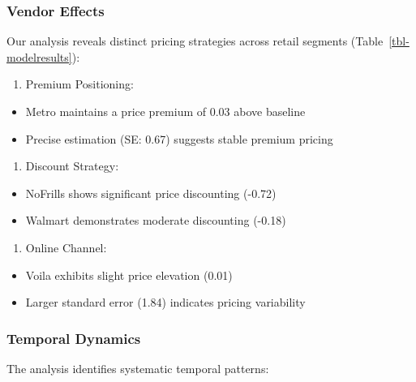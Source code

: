 \documentclass[
  letterpaper,
  DIV=11,
  numbers=noendperiod]{scrartcl}
\providecommand{\tightlist}{%
  \setlength{\itemsep}{0pt}\setlength{\parskip}{0pt}}\usepackage{longtable,booktabs,array}
\begin{document}
\subsubsection{Vendor Effects}\label{vendor-effects}

Our analysis reveals distinct pricing strategies across retail segments
(Table~\ref{tbl-modelresults}):

\begin{enumerate}
\def\labelenumi{\arabic{enumi}.}
\tightlist
\item
  Premium Positioning:
\end{enumerate}

\begin{itemize}
\tightlist
\item
  Metro maintains a price premium of 0.03 above baseline
\item
  Precise estimation (SE: 0.67) suggests stable premium pricing
\end{itemize}

\begin{enumerate}
\def\labelenumi{\arabic{enumi}.}
\setcounter{enumi}{1}
\tightlist
\item
  Discount Strategy:
\end{enumerate}

\begin{itemize}
\tightlist
\item
  NoFrills shows significant price discounting (-0.72)
\item
  Walmart demonstrates moderate discounting (-0.18)
\end{itemize}

\begin{enumerate}
\def\labelenumi{\arabic{enumi}.}
\setcounter{enumi}{2}
\tightlist
\item
  Online Channel:
\end{enumerate}

\begin{itemize}
\tightlist
\item
  Voila exhibits slight price elevation (0.01)
\item
  Larger standard error (1.84) indicates pricing variability
\end{itemize}

\subsubsection{Temporal Dynamics}\label{temporal-dynamics}

The analysis identifies systematic temporal patterns:
\end{document}

